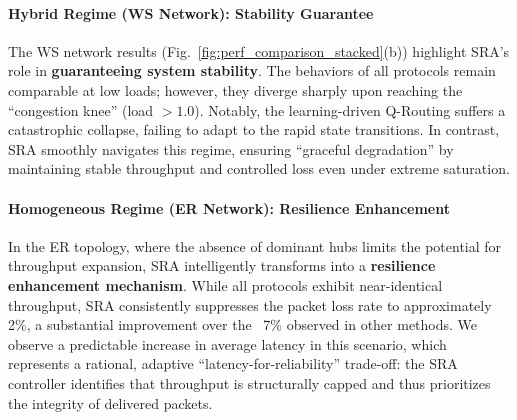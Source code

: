 \documentclass{ccjnl}
\begin{document}
\paragraph{Hybrid Regime (WS Network): Stability Guarantee}
The WS network results (Fig.~\ref{fig:perf_comparison_stacked}(b)) highlight SRA's role in \textbf{guaranteeing system stability}. 
The behaviors of all protocols remain comparable at low loads; however, they diverge sharply upon reaching the ``congestion knee'' (load $> 1.0$). 
Notably, the learning-driven Q-Routing suffers a catastrophic collapse, failing to adapt to the rapid state transitions. 
In contrast, SRA smoothly navigates this regime, ensuring ``graceful degradation'' by maintaining stable throughput and controlled loss even under extreme saturation.

\paragraph{Homogeneous Regime (ER Network): Resilience Enhancement}
In the ER topology, where the absence of dominant hubs limits the potential for throughput expansion, SRA intelligently transforms into a \textbf{resilience enhancement mechanism}. 
While all protocols exhibit near-identical throughput, SRA consistently suppresses the packet loss rate to approximately 2\%, a substantial improvement over the ~7\% observed in other methods. 
We observe a predictable increase in average latency in this scenario, which represents a rational, adaptive ``latency-for-reliability'' trade-off: the SRA controller identifies that throughput is structurally capped and thus prioritizes the integrity of delivered packets.
\end{document}
